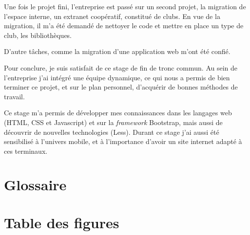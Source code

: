 \documentclass[12pt,a4paper]{article}
\begin{document}
\medskip
Une fois le projet fini, l'entreprise est passé sur un second projet, la migration de l'espace interne, un extranet coopératif, constitué de clubs. En vue de la migration, il m'a été demandé de nettoyer le code et mettre en place un type de club, les bibliothèques. \par 
D'autre tâches, comme la migration d'une application web m'ont été confié.\par
\medskip
Pour conclure, je suis satisfait de ce stage de fin de tronc commun. Au sein de l'entreprise j'ai intégré une équipe dynamique, ce qui nous a permis de bien terminer ce projet, et sur le plan personnel, d'acquérir de bonnes méthodes de travail.\par 
Ce stage m'a permis de développer mes connaissances dans les langages web (\gls{HTML}, \gls{CSS} et Javascript) et sur la \textit{framework} Bootstrap, mais aussi de découvrir de nouvelles technologies (Less). Durant ce stage j'ai aussi été sensibilisé à l'univers mobile, et à l'importance d'avoir un site internet adapté à ces terminaux.\par 
\newpage
\section{Glossaire}
\printglossaries

\section{Table des figures}
\listoffigures
\end{document}
